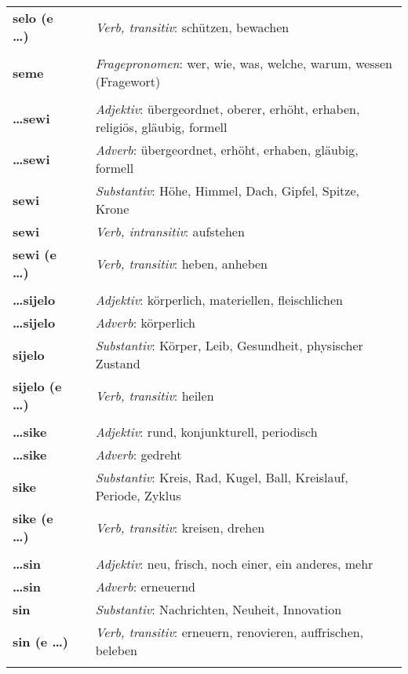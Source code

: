 \begin{supertabular}{p{2,5cm}|ll}
\textbf{selo (e \dots)} && \textit{Verb, transitiv}: schützen, bewachen \\ 
 && \\ %
\textbf{seme} && \textit{Fragepronomen}: wer, wie, was, welche, warum, wessen (Fragewort) \\ 
 && \\ %
\textbf{\dots sewi} && \textit{Adjektiv}: übergeordnet, oberer, erhöht, erhaben, religiös, gläubig, formell \\ 
\textbf{\dots sewi} && \textit{Adverb}: übergeordnet, erhöht, erhaben, gläubig, formell \\ 
\textbf{sewi} && \textit{Substantiv}: Höhe, Himmel, Dach, Gipfel, Spitze, Krone \\ 
\textbf{sewi} && \textit{Verb, intransitiv}: aufstehen \\ 
\textbf{sewi (e \dots)} && \textit{Verb, transitiv}: heben, anheben \\ 
 && \\ %
\textbf{\dots sijelo} && \textit{Adjektiv}:  körperlich, materiellen, fleischlichen \\ 
\textbf{\dots sijelo} && \textit{Adverb}: körperlich \\ 
\textbf{sijelo} && \textit{Substantiv}: Körper, Leib, Gesundheit, physischer Zustand \\ 
\textbf{sijelo (e \dots)} && \textit{Verb, transitiv}: heilen \\ 
 && \\ %
\textbf{\dots sike} && \textit{Adjektiv}:  rund, konjunkturell, periodisch \\ 
\textbf{\dots sike} && \textit{Adverb}: gedreht \\ 
\textbf{sike} && \textit{Substantiv}: Kreis, Rad, Kugel, Ball, Kreislauf, Periode, Zyklus \\ 
\textbf{sike (e \dots)} && \textit{Verb, transitiv}: kreisen, drehen \\ 
 && \\ %
\textbf{\dots sin} && \textit{Adjektiv}: neu, frisch, noch einer, ein anderes, mehr \\ 
\textbf{ \dots sin } && \textit{Adverb}: erneuernd \\ 
\textbf{sin} && \textit{Substantiv}: Nachrichten, Neuheit, Innovation \\ 
\textbf{sin (e \dots)} && \textit{Verb, transitiv}: erneuern, renovieren, auffrischen, beleben \\ 
 && \\ %

\end{supertabular}
